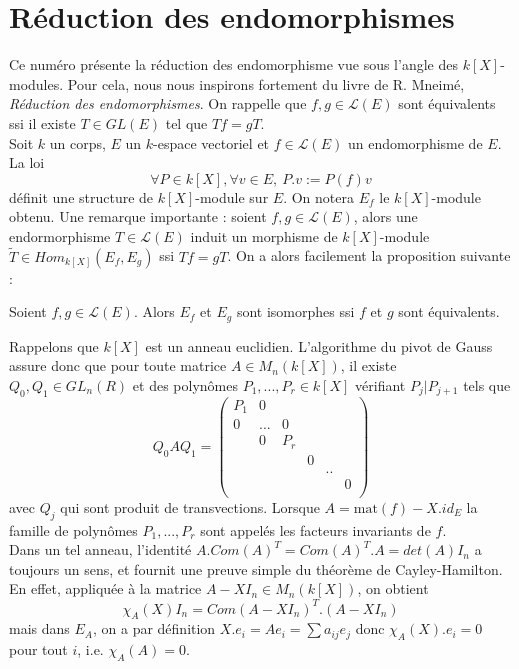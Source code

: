 \section{Réduction des endomorphismes}

Ce numéro présente la réduction des endomorphisme vue sous l'angle des $k[X]$-modules. Pour cela, nous nous inspirons fortement du livre de R. Mneimé, \textit{Réduction des endomorphismes}. On rappelle que $f,g\in \mathcal L(E)$ sont équivalents ssi il existe $T\in GL(E)$ tel que $Tf=gT$.\\

Soit $k$ un corps, $E$ un $k$-espace vectoriel et $f\in \mathcal L(E)$ un endomorphisme de $E$. La loi
\[\forall P\in k[X],\forall v\in E, \ P.v :=P(f)v\]
définit une structure de $k[X]$-module sur $E$. On notera $E_f$ le $k[X]$-module obtenu. Une remarque importante : soient $f,g\in \mathcal L(E)$, alors une endormorphisme $T\in \mathcal L(E)$ induit un morphisme de $k[X]$-module $\tilde T\in Hom_{k[X]}(E_f,E_g)$ ssi $Tf=gT$. On a alors facilement la proposition suivante :

\begin{prop}
Soient $f,g\in \mathcal L(E)$. Alors $E_f$ et $E_g$ sont isomorphes ssi $f$ et $g$ sont équivalents.
\end{prop}

Rappelons que $k[X]$ est un anneau euclidien. L'algorithme du pivot de Gauss assure donc que pour toute matrice $A\in M_n(k[X])$, il existe $Q_0,Q_1\in GL_n(R)$ et des polynômes $P_1,...,P_r\in k[X]$ vérifiant $P_j|P_{j+1}$ tels que 
\[Q_0AQ_1= \begin{pmatrix} 
P_1 & 0 &     &   &  & \\
0 &... & 0    &   &  & \\
  &   0  & P_r &   &  & \\
  &    &      & 0 &  &  \\
  &    &      &   & ..  &  \\
  &    &      &    &  & 0\\
\end{pmatrix}\]
avec $Q_j$ qui sont produit de transvections. Lorsque $A = \text{mat}(f)-X.id_E$ la famille de polynômes $P_1,...,P_r$ sont appelés les facteurs invariants de $f$.\\

Dans un tel anneau, l'identité $A.Com(A)^T = Com(A)^T . A = det(A)I_n$ a toujours un sens, et fournit une preuve simple du théorème de Cayley-Hamilton. En effet, appliquée à la matrice $A-XI_n\in M_n(k[X])$, on obtient 
\[\chi_A(X) I_n = Com(A-XI_n)^T . (A-XI_n)\]
mais dans $E_A$, on a par définition $X.e_i=Ae_i = \sum a_{ij}e_j$ donc $\chi_A(X).e_i=0$ pour tout $i$, i.e. $\chi_A(A)=0$.\\ 

